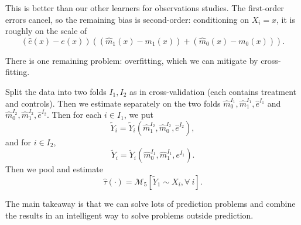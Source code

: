 \begin{aside}	This is better than our other learners for observations studies. The first-order errors cancel, so the remaining bias is second-order: conditioning on $X_i=x$, it is roughly on the scale of
	\[
		\left( \hat{e}(x) - e(x) \right)\left( \left( \hat{m}_1(x) - m_1(x) \right) + \left( \hat{m}_0(x) - m_0(x) \right) \right)
	.\]
\end{aside}

\begin{remark}	There is one remaining problem: overfitting, which we can mitigate by cross-fitting.

	Split the data into two folds $I_1,I_2$ as in cross-validation (each contains treatment and controls). Then we estimate separately on the two folds $\hat{m}_0^{I_1}, \hat{m}_1^{I_1}, \hat{e}^{I_1}$ and $\hat{m}_0^{I_2}, \hat{m}_1^{I_2}, \hat{e}^{I_2}$.
	Then for each $i \in I_1$, we put \[
		\tilde{Y}_i = \tilde{Y}_i \left( \hat{m}_1 ^{I_2}, \hat{m}_0 ^{I_2}, \hat{e}^{I_2} \right)
	,\] 
	and for $i \in I_2$, \[
		\tilde{Y}_i = \tilde{Y}_i\left( \hat{m}_0^{I_1}, \hat{m}_1^{I_1}, e^{I_1} \right)
	.\] 
	Then we pool and estimate \[
		\hat{\tau}(\cdot ) = \mathscr{M}_5\left[ \tilde{Y}_1 \sim X_i, \forall\ i \right]
	.\] 
\end{remark}

The main takeaway is that we can solve lots of prediction problems and combine the results in an intelligent way to solve problems outside prediction.
